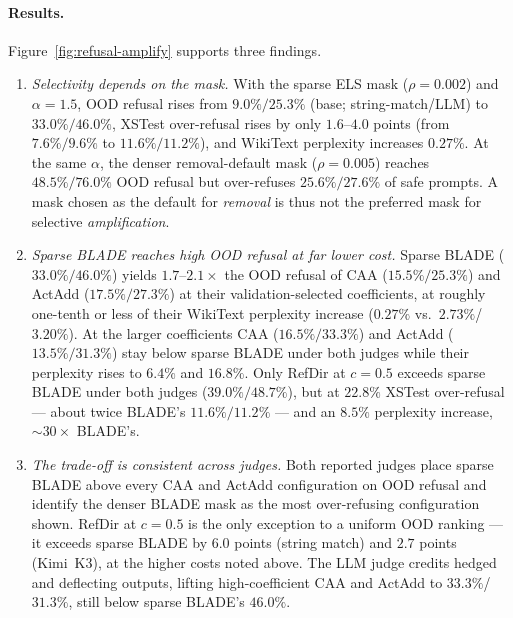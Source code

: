 \paragraph{Results.}
Figure~\ref{fig:refusal-amplify} supports three findings.
\begin{enumerate}
  \item[(i)] \emph{Selectivity depends on the mask.}
    With the sparse ELS mask ($\rho{=}0.002$) and $\alpha{=}1.5$, OOD refusal rises from
    $9.0\%/25.3\%$ (base; string-match/LLM) to $33.0\%/46.0\%$, XSTest over-refusal rises by only
    $1.6$--$4.0$ points (from $7.6\%/9.6\%$ to $11.6\%/11.2\%$), and WikiText perplexity increases
    $0.27\%$. At the same $\alpha$, the denser removal-default mask ($\rho{=}0.005$) reaches
    $48.5\%/76.0\%$ OOD refusal but over-refuses $25.6\%/27.6\%$ of safe prompts. A mask chosen as
    the default for \emph{removal} is thus not the preferred mask for selective \emph{amplification}.
  \item[(ii)] \emph{Sparse BLADE reaches high OOD refusal at far lower cost.}
    Sparse BLADE ($33.0\%/46.0\%$) yields $1.7$--$2.1\times$ the OOD refusal of CAA ($15.5\%/25.3\%$)
    and ActAdd ($17.5\%/27.3\%$) at their validation-selected coefficients, at roughly one-tenth or
    less of their WikiText perplexity increase ($0.27\%$ vs.\ $2.73\%$/$3.20\%$). At the larger
    coefficients CAA ($16.5\%/33.3\%$) and ActAdd ($13.5\%/31.3\%$) stay below sparse BLADE under
    both judges while their perplexity rises to $6.4\%$ and $16.8\%$. Only RefDir at $c{=}0.5$
    exceeds sparse BLADE under both judges ($39.0\%/48.7\%$), but at $22.8\%$ XSTest over-refusal
    --- about twice BLADE's $11.6\%/11.2\%$ --- and an $8.5\%$ perplexity increase, $\sim\!30\times$
    BLADE's.
  \item[(iii)] \emph{The trade-off is consistent across judges.}
    Both reported judges place sparse BLADE above every CAA and ActAdd configuration on OOD refusal
    and identify the denser BLADE mask as the most over-refusing configuration shown. RefDir at
    $c{=}0.5$ is the only exception to a uniform OOD ranking --- it exceeds sparse BLADE by $6.0$
    points (string match) and $2.7$ points (Kimi~K3), at the higher costs noted above. The LLM
    judge credits hedged and deflecting outputs, lifting high-coefficient CAA and ActAdd to
    $33.3\%$/$31.3\%$, still below sparse BLADE's $46.0\%$.
\end{enumerate}
